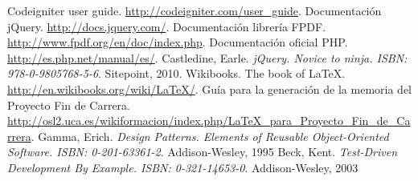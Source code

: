 

\begin{thebibliography}{99}
Codeigniter user guide. \url{http://codeigniter.com/user_guide}.
 Documentación jQuery. \url{http://docs.jquery.com/}.
 Documentación librería FPDF. \url{http://www.fpdf.org/en/doc/index.php}.
 Documentación oficial PHP. \url{http://es.php.net/manual/es/}.
 Castledine, Earle. \emph{jQuery. Novice to ninja. ISBN: 978-0-9805768-5-6}. Sitepoint, 2010.
 Wikibooks. The book of \LaTeX. \url{http://en.wikibooks.org/wiki/LaTeX/}.
Guía para la generación de la memoria del Proyecto Fin de Carrera.\\ \url{http://osl2.uca.es/wikiformacion/index.php/LaTeX_para_Proyecto_Fin_de_Carrera}.
 Gamma, Erich. \emph{Design Patterns. Elements of Reusable Object-Oriented Software. ISBN: 0-201-63361-2}. Addison-Wesley, 1995
 Beck, Kent. \emph{Test-Driven Development By Example. ISBN: 0-321-14653-0}. Addison-Wesley, 2003
\end{thebibliography}